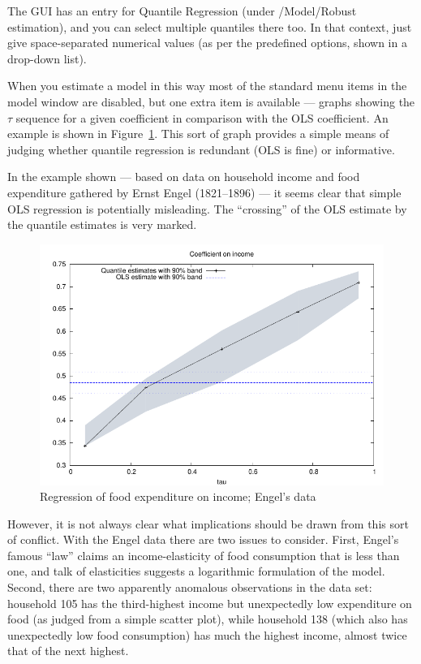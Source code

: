 The  GUI has an entry for Quantile Regression (under
\textsf{/Model/Robust estimation}), and you can select multiple
quantiles there too.  In that context, just give space-separated
numerical values (as per the predefined options, shown in a drop-down
list).  

When you estimate a model in this way most of the standard menu items
in the model window are disabled, but one extra item is available ---
graphs showing the $\tau$ sequence for a given coefficient in
comparison with the OLS coefficient.  An example is shown in
Figure~\ref{fig:tau}.  This sort of graph provides a simple means of
judging whether quantile regression is redundant (OLS is fine) or
informative.  

In the example shown --- based on data on household income and food
expenditure gathered by Ernst Engel (1821--1896) --- it seems clear
that simple OLS regression is potentially misleading.  The
``crossing'' of the OLS estimate by the quantile estimates is very
marked.  

\begin{figure}
  \centering
  \includegraphics{figures/tau-sequence}
  \caption{Regression of food expenditure on income; Engel's data}
  \label{fig:tau}
\end{figure}

However, it is not always clear what implications should be drawn from
this sort of conflict.  With the Engel data there are two issues to
consider.  First, Engel's famous ``law'' claims an income-elasticity
of food consumption that is less than one, and talk of elasticities
suggests a logarithmic formulation of the model.  Second, there are
two apparently anomalous observations in the data set: household 105
has the third-highest income but unexpectedly low expenditure on food
(as judged from a simple scatter plot), while household 138 (which
also has unexpectedly low food consumption) has much the highest
income, almost twice that of the next highest.

